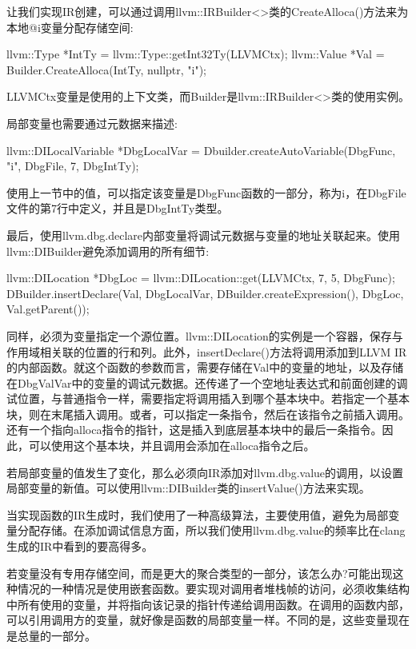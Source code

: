让我们实现IR创建，可以通过调用llvm::IRBuilder<>类的CreateAlloca()方法来为本地@i变量分配存储空间:

\begin{cpp}
llvm::Type *IntTy = llvm::Type::getInt32Ty(LLVMCtx);
llvm::Value *Val = Builder.CreateAlloca(IntTy, nullptr, "i");
\end{cpp}

LLVMCtx变量是使用的上下文类，而Builder是llvm::IRBuilder<>类的使用实例。

局部变量也需要通过元数据来描述:

\begin{cpp}
llvm::DILocalVariable *DbgLocalVar =
    Dbuilder.createAutoVariable(DbgFunc, "i", DbgFile,
                                7, DbgIntTy);
\end{cpp}

使用上一节中的值，可以指定该变量是DbgFunc函数的一部分，称为i，在DbgFile文件的第7行中定义，并且是DbgIntTy类型。

最后，使用llvm.dbg.declare内部变量将调试元数据与变量的地址关联起来。使用llvm::DIBuilder避免添加调用的所有细节:

\begin{cpp}
llvm::DILocation *DbgLoc =
                llvm::DILocation::get(LLVMCtx, 7, 5, DbgFunc);
DBuilder.insertDeclare(Val, DbgLocalVar,
                        DBuilder.createExpression(), DbgLoc,
                        Val.getParent());
\end{cpp}

同样，必须为变量指定一个源位置。llvm::DILocation的实例是一个容器，保存与作用域相关联的位置的行和列。此外，insertDeclare()方法将调用添加到LLVM IR的内部函数。就这个函数的参数而言，需要存储在Val中的变量的地址，以及存储在DbgValVar中的变量的调试元数据。还传递了一个空地址表达式和前面创建的调试位置，与普通指令一样，需要指定将调用插入到哪个基本块中。若指定一个基本块，则在末尾插入调用。或者，可以指定一条指令，然后在该指令之前插入调用。还有一个指向alloca指令的指针，这是插入到底层基本块中的最后一条指令。因此，可以使用这个基本块，并且调用会添加在alloca指令之后。

若局部变量的值发生了变化，那么必须向IR添加对llvm.dbg.value的调用，以设置局部变量的新值。可以使用llvm::DIBuilder类的insertValue()方法来实现。

当实现函数的IR生成时，我们使用了一种高级算法，主要使用值，避免为局部变量分配存储。在添加调试信息方面，所以我们使用llvm.dbg.value的频率比在clang生成的IR中看到的要高得多。

若变量没有专用存储空间，而是更大的聚合类型的一部分，该怎么办?可能出现这种情况的一种情况是使用嵌套函数。要实现对调用者堆栈帧的访问，必须收集结构中所有使用的变量，并将指向该记录的指针传递给调用函数。在调用的函数内部，可以引用调用方的变量，就好像是函数的局部变量一样。不同的是，这些变量现在是总量的一部分。

